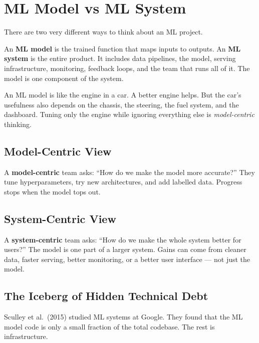 \documentclass[a4paper,11pt]{article}
\newcommand{\vocab}[1]{\textbf{\color{navy}#1}}
\begin{document}
\section{ML Model vs ML System}

There are two very different ways to think about an ML project.

\begin{intuition}
An \vocab{ML model} is the trained function that maps inputs to outputs.
An \vocab{ML system} is the entire product.
It includes data pipelines, the model, serving infrastructure, monitoring, feedback loops, and the team that runs all of it.
The model is one component of the system.
\end{intuition}

\begin{everyday}
An ML model is like the engine in a car.
A better engine helps.
But the car's usefulness also depends on the chassis, the steering, the fuel system, and the dashboard.
Tuning only the engine while ignoring everything else is \emph{model-centric} thinking.
\end{everyday}

\subsection{Model-Centric View}

A \vocab{model-centric} team asks: ``How do we make the model more accurate?''
They tune hyperparameters, try new architectures, and add labelled data.
Progress stops when the model tops out.

\subsection{System-Centric View}

A \vocab{system-centric} team asks: ``How do we make the whole system better for users?''
The model is one part of a larger system.
Gains can come from cleaner data, faster serving, better monitoring, or a better user interface --- not just the model.

\subsection{The Iceberg of Hidden Technical Debt}

Sculley et al.\ (2015) studied ML systems at Google.
They found that the ML model code is only a small fraction of the total codebase.
The rest is infrastructure.
\end{document}
